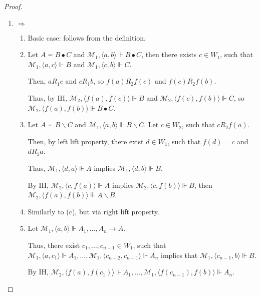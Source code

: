 \documentclass[a4paper]{article}
\theoremstyle{defin}
\theoremstyle{theorem}
\theoremstyle{prop}
\theoremstyle{lemma}
\theoremstyle{ex}
\theoremstyle{col}
\begin{document}
\begin{proof}
$ $

  \begin{enumerate}
    \item $\Rightarrow$
      \begin{enumerate}
        \item Basic case: follows from the definition.
        \item Let $A \eqcirc B \bullet C$ and $\mathcal{M}_1, \langle a, b \rangle \Vdash B \bullet C$, then
        there exists $c \in W_1$, such that $\mathcal{M}_1, \langle a, c \rangle \Vdash B$ and
        $\mathcal{M}_1, \langle c, b \rangle \Vdash C$.

        Then, $a R_1 c$ and $c R_1 b$, so $f(a) R_2 f(c)$ and $f(c) R_2 f(b)$.

        Thus, by IH, $\mathcal{M}_2, \langle f(a), f(c) \rangle \Vdash B$ and
        $\mathcal{M}_2, \langle f(c), f(b) \rangle \Vdash C$, so $\mathcal{M}_2, \langle f(a), f(b) \rangle \Vdash B \bullet C$.
        \item Let $A \eqcirc B \backslash C$ and $\mathcal{M}_1, \langle a, b \rangle \Vdash B \backslash C$.
        Let $c \in W_2$, such that $c R_2 f(a)$.

        Then, by left lift property, there exist $d \in W_1$, such that $f(d) = c$ and $d R_1 a$.

        Thus, $\mathcal{M}_1, \langle d, a \rangle \Vdash A$ implies
        $\mathcal{M}_1, \langle d, b \rangle \Vdash B$.

        By IH, $\mathcal{M}_2, \langle c, f(a) \rangle \Vdash A$ implies
        $\mathcal{M}_2, \langle c, f(b) \rangle \Vdash B$, then $\mathcal{M}_2, \langle f(a), f(b) \rangle \Vdash A \backslash B$.

        \item Similarly to (c), but via right lift property.
        \item Let $\mathcal{M}_1, \langle a, b \rangle \Vdash A_1, \dots, A_n \rightarrow A$.

        Thus, there exist $c_1, \dots, c_{n-1} \in W_1$, such that
        $\mathcal{M}_1, \langle a, c_1 \rangle \Vdash A_1, \dots, \mathcal{M}_1, \langle c_{n-2}, c_{n-1} \rangle \Vdash A_n$
        implies that $\mathcal{M}_1, \langle c_{n-1}, b \rangle \Vdash B$.

        By IH, $\mathcal{M}_2, \langle f(a), f(c_1) \rangle \Vdash A_1, \dots, \mathcal{M}_1, \langle f(c_{n-1}), f(b) \rangle \Vdash A_n$.


\end{enumerate}
\end{enumerate}
\end{proof}
\end{document}
